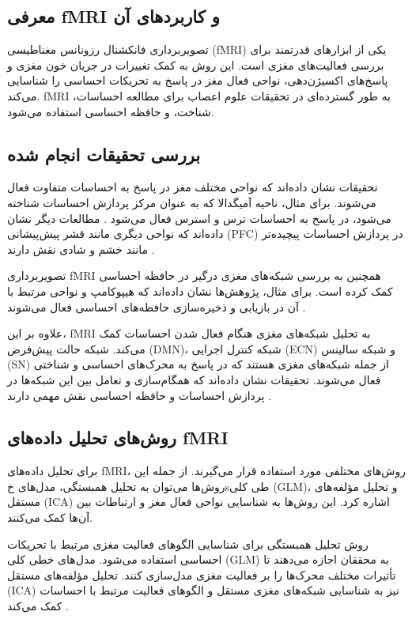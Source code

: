 \documentclass[12pt]{article}
\begin{document}
\subsection{معرفی fMRI و کاربردهای آن}

تصویربرداری فانکشنال رزونانس مغناطیسی (fMRI) یکی از ابزارهای قدرتمند برای بررسی فعالیت‌های مغزی است. این روش به کمک تغییرات در جریان خون مغزی و پاسخ‌های اکسیژن‌دهی، نواحی فعال مغز در پاسخ به تحریکات احساسی را شناسایی می‌کند. fMRI به طور گسترده‌ای در تحقیقات علوم اعصاب برای مطالعه احساسات، شناخت، و حافظه احساسی استفاده می‌شود.

\subsection{بررسی تحقیقات انجام شده}

تحقیقات نشان داده‌اند که نواحی مختلف مغز در پاسخ به احساسات متفاوت فعال می‌شوند. برای مثال، ناحیه آمیگدالا که به عنوان مرکز پردازش احساسات شناخته می‌شود، در پاسخ به احساسات ترس و استرس فعال می‌شود \cite{Liu2018}. مطالعات دیگر نشان داده‌اند که نواحی دیگری مانند قشر پیش‌پیشانی (PFC) در پردازش احساسات پیچیده‌تر مانند خشم و شادی نقش دارند \cite{He2020}.

تصویربرداری fMRI همچنین به بررسی شبکه‌های مغزی درگیر در حافظه احساسی کمک کرده است. برای مثال، پژوهش‌ها نشان داده‌اند که هیپوکامپ و نواحی مرتبط با آن در بازیابی و ذخیره‌سازی حافظه‌های احساسی فعال می‌شوند \cite{Zhao2021}.

علاوه بر این، fMRI به تحلیل شبکه‌های مغزی هنگام فعال شدن احساسات کمک می‌کند. شبکه حالت پیش‌فرض (DMN)، شبکه کنترل اجرایی (ECN) و شبکه سالینس (SN) از جمله شبکه‌های مغزی هستند که در پاسخ به محرک‌های احساسی و شناختی فعال می‌شوند. تحقیقات نشان داده‌اند که همگام‌سازی و تعامل بین این شبکه‌ها در پردازش احساسات و حافظه احساسی نقش مهمی دارند \cite{Liu2018}.

\subsection{روش‌های تحلیل داده‌های fMRI}

برای تحلیل داده‌های fMRI، روش‌های مختلفی مورد استفاده قرار می‌گیرند. از جمله این روش‌ها می‌توان به تحلیل همبستگی، مدل‌های خsطی کلی (GLM)، و تحلیل مؤلفه‌های مستقل (ICA) اشاره کرد. این روش‌ها به شناسایی نواحی فعال مغز و ارتباطات بین آن‌ها کمک می‌کنند.

روش تحلیل همبستگی برای شناسایی الگوهای فعالیت مغزی مرتبط با تحریکات احساسی استفاده می‌شود. مدل‌های خطی کلی (GLM) به محققان اجازه می‌دهند تا تأثیرات مختلف محرک‌ها را بر فعالیت مغزی مدل‌سازی کنند. تحلیل مؤلفه‌های مستقل (ICA) نیز به شناسایی شبکه‌های مغزی مستقل و الگوهای فعالیت مرتبط با احساسات کمک می‌کند \cite{Liu2018}.
\end{document}
